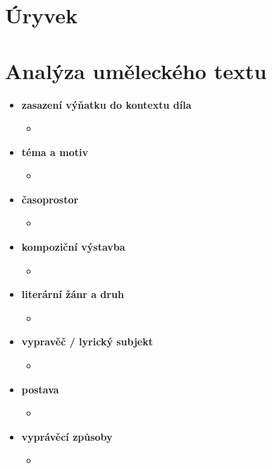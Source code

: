\documentclass[11pt]{article}
\begin{document}
    \begin{center}
        \underline{\textbf{\Huge }}
    \end{center}
    \section*{Úryvek}
    \section*{Analýza uměleckého textu}
    \begin{itemize}
        \item\textbf{zasazení výňatku do kontextu díla}
        \begin{itemize}
            \item
        \end{itemize}
        \item\textbf{téma a motiv}
        \begin{itemize}
            \item
        \end{itemize}
        \item\textbf{časoprostor}
        \begin{itemize}
            \item
        \end{itemize}
        \item\textbf{kompoziční výstavba}
        \begin{itemize}
            \item
        \end{itemize}
        \item\textbf{literární žánr a druh}
        \begin{itemize}
            \item
        \end{itemize}
        \item\textbf{vypravěč / lyrický subjekt}
        \begin{itemize}
            \item
        \end{itemize}
        \item\textbf{postava}
        \begin{itemize}
            \item
        \end{itemize}
        \item\textbf{vyprávěcí způsoby}
        \begin{itemize}
            \item

\end{itemize}
\end{itemize}
\end{document}
